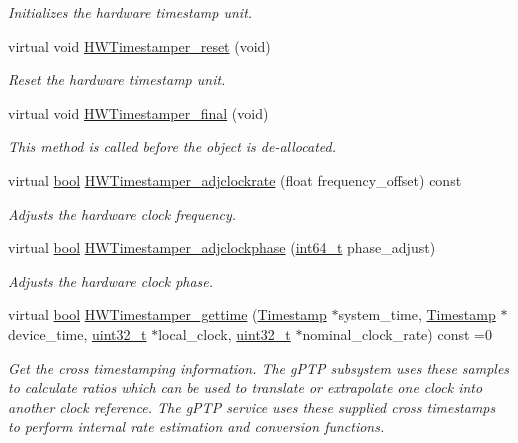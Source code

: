 \begin{DoxyCompactItemize}
\begin{DoxyCompactList}\small\item\em Initializes the hardware timestamp unit. \end{DoxyCompactList}\item 
virtual void \hyperlink{class_common_timestamper_a1ee6bfcaf63bef07bbed1306e52e7203}{H\+W\+Timestamper\+\_\+reset} (void)
\begin{DoxyCompactList}\small\item\em Reset the hardware timestamp unit. \end{DoxyCompactList}\item 
virtual void \hyperlink{class_common_timestamper_a866fc2519a7b2a696e350ed05df53f90}{H\+W\+Timestamper\+\_\+final} (void)
\begin{DoxyCompactList}\small\item\em This method is called before the object is de-\/allocated. \end{DoxyCompactList}\item 
virtual \hyperlink{avb__gptp_8h_af6a258d8f3ee5206d682d799316314b1}{bool} \hyperlink{class_common_timestamper_a557b905a4f8bb20481c28c8dd33cfb21}{H\+W\+Timestamper\+\_\+adjclockrate} (float frequency\+\_\+offset) const 
\begin{DoxyCompactList}\small\item\em Adjusts the hardware clock frequency. \end{DoxyCompactList}\item 
virtual \hyperlink{avb__gptp_8h_af6a258d8f3ee5206d682d799316314b1}{bool} \hyperlink{class_common_timestamper_aa9470ea1623c3718913fbff1c55e3115}{H\+W\+Timestamper\+\_\+adjclockphase} (\hyperlink{parse_8c_a67a9885ef4908cb72ce26d75b694386c}{int64\+\_\+t} phase\+\_\+adjust)
\begin{DoxyCompactList}\small\item\em Adjusts the hardware clock phase. \end{DoxyCompactList}\item 
virtual \hyperlink{avb__gptp_8h_af6a258d8f3ee5206d682d799316314b1}{bool} \hyperlink{class_common_timestamper_a10b54d66a60067c0084748f955164073}{H\+W\+Timestamper\+\_\+gettime} (\hyperlink{class_timestamp}{Timestamp} $\ast$system\+\_\+time, \hyperlink{class_timestamp}{Timestamp} $\ast$device\+\_\+time, \hyperlink{parse_8c_a6eb1e68cc391dd753bc8ce896dbb8315}{uint32\+\_\+t} $\ast$local\+\_\+clock, \hyperlink{parse_8c_a6eb1e68cc391dd753bc8ce896dbb8315}{uint32\+\_\+t} $\ast$nominal\+\_\+clock\+\_\+rate) const =0
\begin{DoxyCompactList}\small\item\em Get the cross timestamping information. The g\+P\+TP subsystem uses these samples to calculate ratios which can be used to translate or extrapolate one clock into another clock reference. The g\+P\+TP service uses these supplied cross timestamps to perform internal rate estimation and conversion functions. \end{DoxyCompactList}\item 

\end{DoxyCompactItemize}
